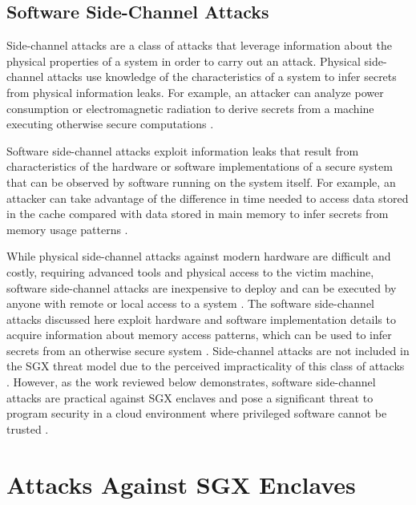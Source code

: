 \subsection{Software Side-Channel Attacks}

Side-channel attacks are a class of attacks that leverage information about the physical properties of a system in order to carry out an attack. Physical side-channel attacks use knowledge of the characteristics of a system to infer secrets from physical information leaks. For example, an attacker can analyze power consumption or electromagnetic radiation to derive secrets from a machine executing otherwise secure computations \cite{standaert_introduction_2010}. 

Software side-channel attacks exploit information leaks that result from characteristics of the hardware or software implementations of a secure system that can be observed by software running on the system itself. For example, an attacker can take advantage of the difference in time needed to access data stored in the cache compared with data stored in main memory to infer secrets from memory usage patterns \cite{costan_intel_2016}. 

While physical side-channel attacks against modern hardware are difficult and costly, requiring advanced tools and physical access to the victim machine, software side-channel attacks are inexpensive to deploy and can be executed by anyone with remote or local access to a system \cite{costan_intel_2016}. The software side-channel attacks discussed here exploit hardware and software implementation details to acquire information about memory access patterns, which can be used to infer secrets from an otherwise secure system \cite{gotzfried_cache_2017, schwarz_malware_2017, xu_controlled-channel_2015, shinde_preventing_2015}. Side-channel attacks are not included in the SGX threat model due to the perceived impracticality of this class of attacks \cite{intel_corporation_intel_2016, costan_intel_2016}. However, as the work reviewed below demonstrates, software side-channel attacks are practical against SGX enclaves and pose a significant threat to program security in a cloud environment where privileged software cannot be trusted \cite{moghimi_cachezoom:_2017, intel_corporation_tutorial_2015}.

\section{Attacks Against SGX Enclaves}

